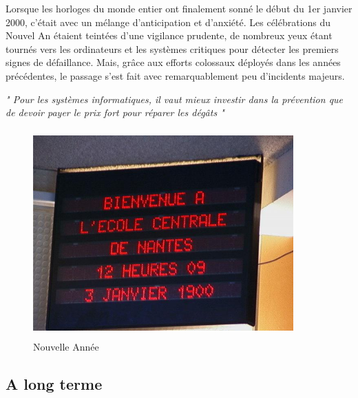 \documentclass[12pt,a4paper]{article}
\begin{document}
Lorsque les horloges du monde entier ont finalement sonné le début du 1er janvier 2000, c'était avec un mélange d'anticipation et d'anxiété. Les célébrations du Nouvel An étaient teintées d'une vigilance prudente, de nombreux yeux étant tournés vers les ordinateurs et les systèmes critiques pour détecter les premiers signes de défaillance. Mais, grâce aux efforts colossaux déployés dans les années précédentes, le passage s'est fait avec remarquablement peu d'incidents majeurs.\\

\begin{center}
\color {red}\textit{" Pour les systèmes informatiques, il vaut mieux investir dans la prévention que de devoir payer le prix fort pour réparer les dégâts " }
\end{center}
\cite{livre}


\begin{figure}[H]
    \centering
    \includegraphics[width=10cm, height=8cm]{./images/bug10.jpg}
    \caption{Nouvelle Année}
\end{figure} 

\newpage
\subsection{A long terme}
\end{document}
